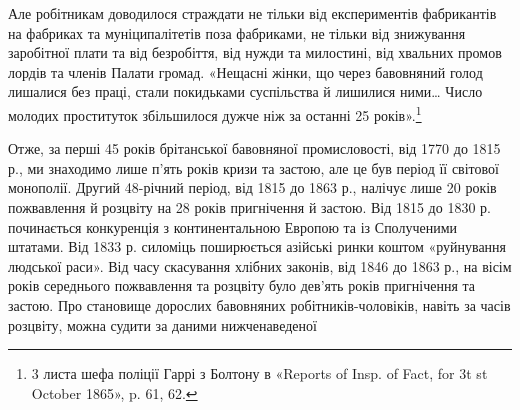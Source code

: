 \parcont{}  %
Але робітникам доводилося страждати не тільки від експериментів
фабрикантів на фабриках та муніципалітетів поза фабриками,
не тільки від знижування заробітної плати та від безробіття, від
нужди та милостині, від хвальних промов лордів та членів Палати
громад. «Нещасні жінки, що через бавовняний голод лишалися
без праці, стали покидьками суспільства й лишилися ними\dots{}
Число молодих проституток збільшилося дужче ніж за останні
25 років».\footnote{
3 листа шефа поліції Гаррі з Болтону в «Reports of Insp. of Fact,
for 3t st October 1865», p. 61, 62.
}

Отже, за перші 45 років брітанської бавовняної промисловості,
від 1770 до 1815 р., ми знаходимо лише п’ять років кризи та застою,
але це був період її світової монополії. Другий 48-річний період,
від 1815 до 1863 р., налічує лише 20 років пожвавлення
й розцвіту на 28 років пригнічення й застою. Від 1815 до 1830 р.
починається конкуренція з континентальною Европою та із
Сполученими штатами. Від 1833 р. силоміць поширюється азійські
ринки коштом «руйнування людської раси». Від часу скасування
хлібних законів, від 1846 до 1863 р., на вісім років середнього
пожвавлення та розцвіту було дев’ять років пригнічення
та застою. Про становище дорослих бавовняних робітників-чоловіків,
навіть за часів розцвіту, можна судити за даними нижченаведеної
